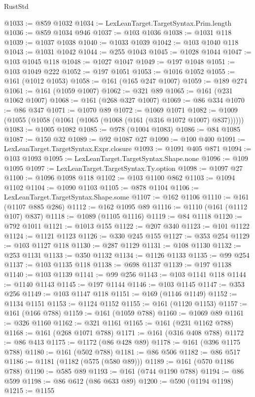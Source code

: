 \begin{lexlean}{RustStd}
\begin{coremodule}
{\begin{coremodule}
{{{{{{{{{{{{{{{{{{{{{{{{{{@1033 := @859 @1032
@1034 := LexLeanTarget.TargetSyntax.Prim.length
@1036 := @859 @1034 @946
@1037 := @103 @1036
@1038 := @1031 @118
@1039 := @1037 @1038
@1040 := @1033 @1039
@1042 := @103 @1040 @118
@1043 := @1031 @1042
@1044 := @255 @1043
@1045 := @1028 @1044
@1047 := @103 @1045 @118
@1048 := @1027 @1047
@1049 := @197 @1048
@1051 := @103 @1049 @222
@1052 := @197 @1051
@1053 := @1016 @1052
@1055 := @161 (@1012 @1053)
@1058 := @161 (@165 @247 @1007)
@1059 := @189 @274
@1061 := @161 (@1059 @1007)
@1062 := @321 @89
@1065 := @161 (@231 @1062 @1007)
@1068 := @161 (@268 @327 @1007)
@1069 := @86 @334
@1070 := @86 @347
@1071 := @1070 @89
@1072 := @1069 @1071
@1082 := @1009 (@1055 (@1058 (@1061 (@1065 (@1068 (@161 (@316 @1072 @1007) @837))))))
@1083 := @1005 @1082
@1085 := @978 (@1004 @1083)
@1086 := @84 @1085
@1087 := @150 @32
@1089 := @92 @1087 @27
@1090 := @100 @400
@1091 := LexLeanTarget.TargetSyntax.Expr.closure
@1093 := @1091 @405 @871
@1094 := @103 @1093
@1095 := LexLeanTarget.TargetSyntax.Shape.none
@1096 := @109 @1095
@1097 := LexLeanTarget.TargetSyntax.Ty.option
@1098 := @1097 @27
@1100 := @1096 @1098 @118
@1102 := @103 @1100 @862
@1103 := @1094 @1102
@1104 := @1090 @1103
@1105 := @878 @1104
@1106 := LexLeanTarget.TargetSyntax.Shape.some
@1107 := @162 @1106
@1110 := @161 (@1107 @885 @286)
@1112 := @162 @1095 @89
@1116 := @1110 (@161 (@1112 @107) @837)
@1118 := @1089 (@1105 @1116)
@1119 := @84 @1118
@1120 := @792 @1011
@1121 := @1013 @155
@1122 := @207 @340
@1123 := @101 @1122
@1124 := @1121 @1123
@1126 := @330 @245 @155
@1127 := @353 @254
@1129 := @103 @1127 @118
@1130 := @287 @1129
@1131 := @108 @1130
@1132 := @253 @1131
@1133 := @350 @1132
@1134 := @1126 @1133
@1135 := @99 @254
@1137 := @103 @1135 @118
@1138 := @698 @1137
@1139 := @197 @1138
@1140 := @103 @1139
@1141 := @99 @256
@1143 := @103 @1141 @118
@1144 := @1140 @1143
@1145 := @197 @1144
@1146 := @103 @1145
@1147 := @353 @256
@1149 := @103 @1147 @118
@1151 := @169 (@1146 @1149)
@1152 := @1134 @1151
@1153 := @1124 @1152
@1155 := @161 (@1120 @1153)
@1157 := @161 (@166 @788)
@1159 := @161 (@1059 @788)
@1160 := @1069 @89
@1161 := @326 @1160
@1162 := @321 @1161
@1165 := @161 (@231 @1162 @788)
@1168 := @161 (@268 @1071 @788)
@1171 := @161 (@316 @408 @788)
@1172 := @86 @413
@1175 := @1172 (@86 @428 @89)
@1178 := @161 (@396 @1175 @788)
@1180 := @161 (@502 @788)
@1181 := @86 @506
@1182 := @86 @517
@1186 := @1181 (@1182 (@575 (@580 @89)))
@1189 := @161 (@570 @1186 @788)
@1190 := @585 @89
@1193 := @161 (@744 @1190 @788)
@1194 := @86 @599
@1198 := @86 @612 (@86 @633 @89)
@1200 := @590 (@1194 @1198)
@1215 := @1155
}}}}}}}}}}}}}}}}}}}}}}}}}}
\end{coremodule}}
\end{coremodule}
\end{lexlean}
